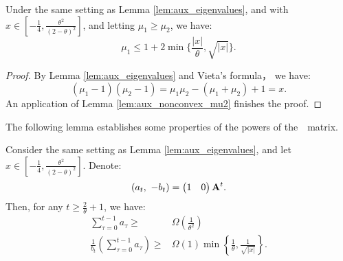 \begin{lemma}\label{lem:aux_nonconvex_mu1}
Under the same setting as Lemma \ref{lem:aux_eigenvalues}, and with
$x \in [-\frac{1}{4}, \frac{\theta^2}{(2-\theta)^2}]$, and letting
$\mu_1 \ge \mu_2$, we have:
\begin{equation*}
\mu_1 \le 1 + 2 \min\{\frac{|x|}{\theta}, \sqrt{|x|}\}.
\end{equation*}
\end{lemma}
\begin{proof}
By Lemma \ref{lem:aux_eigenvalues} and Vieta's formula， we have:
$$(\mu_1 - 1)(\mu_2-1) = \mu_1\mu_2 - (\mu_1 + \mu_2) + 1 = x.$$
An application of Lemma \ref{lem:aux_nonconvex_mu2} finishes the proof.
\end{proof}
The following lemma establishes some properties of the powers of the~\nag~matrix.
\begin{lemma}\label{lem:aux_nonconvex_inequal}
Consider the same setting as Lemma \ref{lem:aux_eigenvalues}, and let
$x \in [-\frac{1}{4}, \frac{\theta^2}{(2-\theta)^2}]$.
Denote:
\begin{equation*}
(a_t, ~-b_t) = \begin{pmatrix} 1 & 0  \end{pmatrix} \mathbf{A}^t.
\end{equation*}
Then, for any $t \ge \frac{2}{\theta} + 1$, we have:
\begin{align*}
\sum_{\tau = 0}^{t-1} a_\tau \ge& \Omega (\frac{1}{\theta^2}) \\
\frac{1}{b_t}\left(\sum_{\tau = 0}^{t-1} a_\tau \right) \ge& \Omega(1)\min\left\{\frac{1}{\theta}, \frac{1}{\sqrt{|x|}}\right\}.
\end{align*}
\end{lemma}

